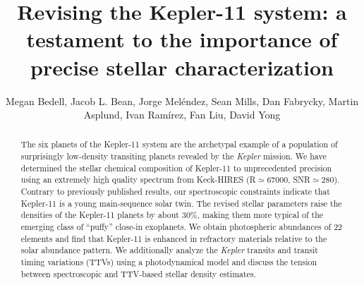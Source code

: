 \documentclass[oneside]{emulateapj}
\begin{document}
\graphicspath{ {figures/} }

\title{Revising the Kepler-11 system: a testament to the importance of precise stellar characterization}

\author{Megan Bedell,
Jacob L. Bean,
Jorge Mel\'{e}ndez,
Sean Mills,
Dan Fabrycky,
Martin Asplund,
Ivan Ram\'{i}rez,
Fan Liu,
David Yong}




\begin{abstract}

The six planets of the Kepler-11 system are the archetypal example of a population of surprisingly low-density transiting planets revealed by the \textit{Kepler} mission. We have determined the stellar chemical composition of Kepler-11 to unprecedented precision using an extremely high quality spectrum from Keck-HIRES (R$\simeq$67000, SNR$\simeq$280). Contrary to previously published results, our spectroscopic constraints indicate that Kepler-11 is a young main-sequence solar twin. The revised stellar parameters raise the densities of the Kepler-11 planets by about 30\%, making them more typical of the emerging class of ``puffy'' close-in exoplanets. We obtain photospheric abundances of 22 elements and find that Kepler-11 is enhanced in refractory materials relative to the solar abundance pattern. We additionally analyze the \textit{Kepler} transits and transit timing variations (TTVs) using a photodynamical model and discuss the tension between spectroscopic and TTV-based stellar density estimates.

\end{abstract}
\end{document}
